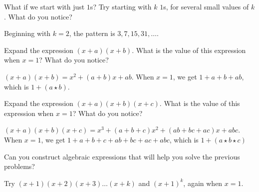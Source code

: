 \documentclass[handout,space,nooutcomes]{ximera}
\begin{document}
\begin{problem}
What if we start with just $1$s?  Try starting with $k$ $1$s, for several small values of $k$.  What do you notice?  
\begin{freeResponse}
Beginning with $k=2$, the pattern is $3, 7, 15, 31, \dots$.  
\end{freeResponse}
\end{problem}

\newpage 

\begin{problem}
Expand the expression $(x+a)(x+b)$.  What is the value of this expression when $x=1$?  What do you notice?
\begin{freeResponse}
$(x+a)(x+b) = x^2+ (a+b)x+ab$.  When $x=1$, we get $1+a+b+ab$, which is $1+(a\star b)$.  
\end{freeResponse}
\end{problem}

\begin{problem}
Expand the expression $(x+a)(x+b)(x+c)$.  What is the value of this expression when $x=1$?  What do you notice?
\begin{freeResponse}
$(x+a)(x+b)(x+c) = x^3+ (a+b+c)x^2+(ab+bc+ac)x+abc$.  When $x=1$, we get $1+a+b+c+ab+bc+ac+abc$, 
which is $1+(a\star b\star c)$
\end{freeResponse}
\end{problem}

\begin{problem}
Can you construct algebraic expressions that will help you solve the previous problems?  
\begin{freeResponse}
Try $(x+1)(x+2)(x+3)\dots(x+k)$ and $(x+1)^k$, again when $x=1$.  
\end{freeResponse}
\end{problem}
\end{document}
